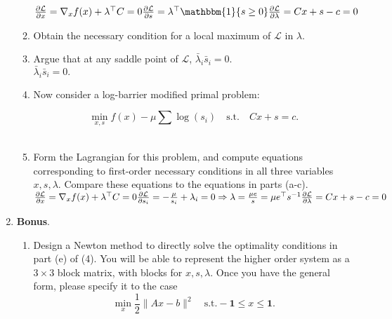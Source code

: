 \documentclass[12pt]{amsart}
\newcommand{\grad}{\nabla}
\begin{document}
\begin{enumerate}
\begin{enumerate}
$\frac{\partial \mathcal{L}}{\partial x} = \grad_x f(x) + \lambda^\top C = 0 \\
\frac{\partial \mathcal{L}}{\partial s} = \lambda^\top \mathbbm{1}\{s \geq 0\} \\   
\frac{\partial \mathcal{L}}{\partial \lambda} = Cx + s - c = 0 \\
$

\item Obtain the necessary condition for a local maximum of $\mathcal L$ in $\lambda$. \\

\item Argue that at any saddle point of $\mathcal L$, $\bar \lambda_i \bar s_i = 0$.  \\ 

$\bar \lambda_i \bar s_i = 0    .$



\item Now consider a log-barrier modified primal problem: 

\[
\min_{x,s} f(x)  - \mu\sum \log(s_i) \quad \text{s.t.} \quad Cx +s =c.
\]
\\
\item Form the Lagrangian for this problem, and compute equations corresponding to first-order necessary conditions in all three variables $x, s, \lambda$. 
Compare these equations to the equations in parts (a-c). \\

$\frac{\partial \mathcal{L}}{\partial x} = \grad_x f(x) + \lambda^\top C = 0 \\
\frac{\partial \mathcal{L}}{\partial s_i} = -\frac{\mu}{s_i} + \lambda_i = 0 \Rightarrow \lambda = \frac{\mu e}{s} = \mu e^\top s^{-1} \\
\frac{\partial \mathcal{L}}{\partial \lambda} = Cx + s - c = 0 \\
$



\end{enumerate}
\newpage
\item {\bf Bonus}. 

\begin{enumerate}
\item
Design a Newton method to directly solve the optimality conditions in part (e) of (4). You will be able to represent the higher order system
as a $3 \times 3$ block matrix, with blocks for $x, s, \lambda$.  Once you have the general form, please specify it to the case
\[
\min_x \frac{1}{2}\|Ax -b\|^2 \quad \text{s.t.} -\mathbf{1} \leq x \leq \mathbf{1}.
\]


\end{enumerate}
\end{enumerate}
\end{document}
